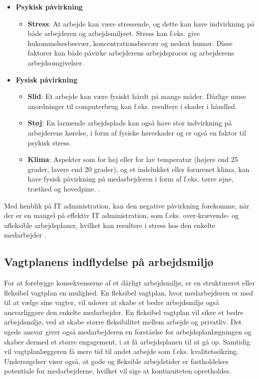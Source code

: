 \begin{itemize}
    \item {\textbf{Psykisk påvirkning} \citep{Arbejdsmiljoe_psykisk}}
    \begin{itemize}
    \item {\textbf{Stress}: At arbejde kan være stressende, og dette kan have indvirkning på både arbejderen og arbejdsmiljøet. Stress kan f.eks. give hukommelsesbesvær, koncentrationsbesvær og nedsat humør. Disse faktorer kan både påvirke arbejderens arbejdsproces og arbejderens arbejdsomgivelser. \citep{Arbejdsmiljoe_stress}}\\
    \end{itemize}
    \item {\textbf{Fysisk påvirkning} \citep{Arbejdsmiljoe_fysisk}}
    \begin{itemize}
    \item {\textbf{Slid}: Et arbejde kan være fysiskt hårdt på mange måder. Dårlige muse anordninger til computerbrug kan f.eks. resultere i skader i håndled. \citep{Arbejdsmiljoe_fysisk}}
    \item {\textbf{Støj}: En larmende arbejdsplads kan også have stor indvirkning på arbejderens hørelse, i form af fysiske høreskader og er også en faktor til psykisk stress. \citep{Arbejdsmiljoe_stoej}}
    \item {\textbf{Klima}: Aspekter som for høj eller for lav temperatur (højere end 25 grader, lavere end 20 grader), og et indelukket eller forurenet klima, kan have fysisk påvirkning på medarbejderen i form af f.eks. tørre øjne, træthed og hovedpine. \citep{Arbejdsmiljoe_indeklima}.}\\
    \end{itemize}
\end{itemize}

Med henblik på IT administration, kan den negative påvirkning forekomme, når der er en mangel på effektiv IT administration, som f.eks. over-krævende- og ufleksible arbejdsplaner, hvilket kan resultere i stress hos den enkelte medarbejder \citep{Cambridge2011}.

\subsection{Vagtplanens indflydelse på arbejdsmiljø}
For at forebygge konsekvenserne af et dårligt arbejdsmiljø, er en struktureret eller fleksibel vagtplan en mulighed. En fleksibel vagtplan, hvor medarbejderen er med til at vælge sine vagter, vil udover at skabe et bedre arbejdsmiljø også ansvarliggøre den enkelte medarbejder. En fleksibel vagtplan vil sikre et bedre arbejdsmiljø, ved at skabe større fleksibilitet mellem arbejde og privatliv. Det øgede ansvar giver også medarbejderen en forståelse for arbejdsplanlægningen og skaber dermed et større engagement, i at få arbejdsplanen til at gå op. Samtidig vil vagtplanlæggeren få mere tid til andet arbejde som f.eks. kvalitetssikring.
Undersøgelser viser også, at gode og fleksible arbejdstider er fastholdelses potentiale for medarbejderne, hvilket vil sige at kontinuiteten opretholdes. \citep{It_armil} 

